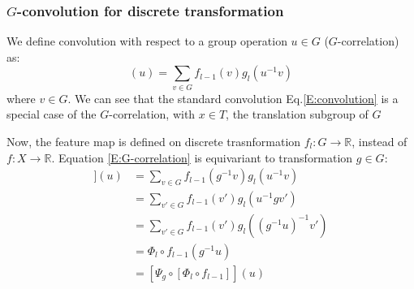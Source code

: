 \documentclass{IEEEtran}
\begin{document}
\subsubsection*{$G$-convolution for discrete transformation}
We define convolution with respect to a group operation $u\in G$ ($G$-correlation) as:
\begin{equation}
    [\Phi_l \circ f_{l-1}](u) = \sum_{v\in G} f_{l-1}(v) g_l(u^{-1}v) \label{E:G-correlation}
\end{equation}
where $v \in G$.
We can see that the standard convolution Eq.\eqref{E:convolution} is a special case of the $G$-correlation,
with $x \in T$, the translation subgroup of $G$

Now, the feature map is defined on discrete 
trasnformation $f_l\colon G\to \mathbb{R}$, instead of $f\colon X\to \mathbb{R}$. 
Equation \eqref{E:G-correlation} is equivariant to transformation $g \in G$:
\begin{align*}
    [\Phi_l \circ [\Psi_g \circ f_{l-1}]](u) 
        &= \sum_{v\in G} f_{l-1}(g^{-1}v) g_l(u^{-1}v) \\
        &= \sum_{v'\in G} f_{l-1}(v') g_l(u^{-1}gv') \\
        &= \sum_{v'\in G} f_{l-1}(v') g_l((g^{-1}u)^{-1}v') \\
        &= \Phi_l \circ f_{l-1} (g^{-1}u) \\
        &= [\Psi_g \circ [\Phi_l \circ f_{l-1}]](u)
\end{align*}

\end{document}
